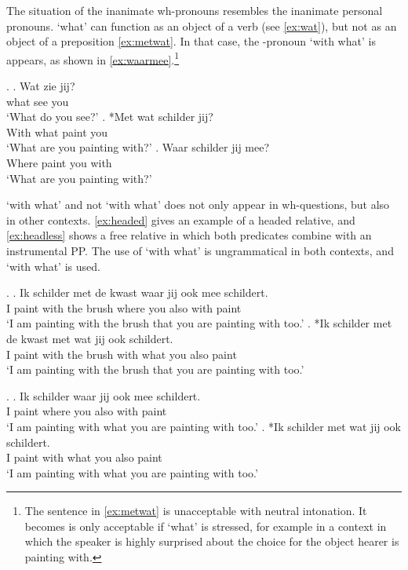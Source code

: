\documentclass{article}
\begin{document}
The situation of the inanimate wh-pronouns resembles the inanimate personal pronouns.  `what' can function as an object of a verb (see \ref{ex:wat}), but not as an object of a preposition \ref{ex:metwat}. In that case, the -pronoun  `with what' is appears, as shown in \ref{ex:waarmee}.\footnote{The sentence in \ref{ex:metwat} is unacceptable with neutral intonation. It becomes is only acceptable if  `what' is stressed, for example in a context in which the speaker is highly surprised about the choice for the object hearer is painting with.}

\ex.
\ag. Wat zie jij?\\
 what see you\\
 `What do you see?'\label{ex:wat}
\bg. *Met wat schilder jij?\\
 With what paint you\\
 `What are you painting with?'\label{ex:metwat}
\bg. Waar schilder jij mee?\\
 Where paint you with\\
 `What are you painting with?'\label{ex:waarmee}

 `with what' and not  `with what' does not only appear in wh-questions, but also in other contexts. \ref{ex:headed} gives an example of a headed relative, and \ref{ex:headless} shows a free relative in which both predicates combine with an instrumental PP. The use of  `with what' is ungrammatical in both contexts, and  `with what' is used.

\ex.\label{ex:headed}
\ag. Ik schilder met de kwast waar jij ook mee schildert.\\
 I paint with the brush where you also with paint\\
 `I am painting with the brush that you are painting with too.'
\bg. *Ik schilder met de kwast met wat jij ook schildert.\\
 I paint with the brush with what you also paint\\
 `I am painting with the brush that you are painting with too.'

 \ex.\label{ex:headless}
 \ag. Ik schilder waar jij ook mee schildert.\\
  I paint where you also with paint\\
  `I am painting with what you are painting with too.'
 \bg. *Ik schilder met wat jij ook schildert.\\
  I paint with what you also paint\\
  `I am painting with what you are painting with too.'
\end{document}
